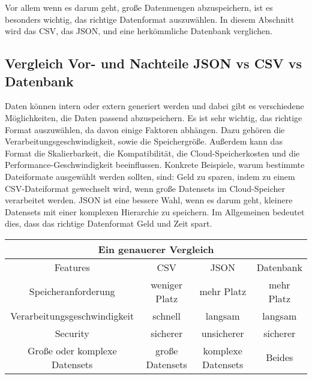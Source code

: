 Vor allem wenn es darum geht, große Datenmengen abzuspeichern, ist es besonders wichtig, das richtige Datenformat auszuwählen. In diesem Abschnitt wird das CSV, das JSON, und eine herkömmliche Datenbank verglichen. 

\subsection{Vergleich Vor- und Nachteile JSON vs CSV vs Datenbank}

Daten können intern oder extern generiert werden und dabei gibt es verschiedene Möglichkeiten, die Daten passend abzuspeichern. Es ist sehr wichtig, das richtige Format auszuwählen, da davon einige Faktoren abhängen. Dazu gehören die Verarbeitungsgeschwindigkeit, sowie die Speichergröße. 
Außerdem kann das Format die Skalierbarkeit, die Kompatibilität, die Cloud-Speicherkosten und die Performance-Geschwindigkeit beeinflussen. 
Konkrete Beispiele, warum bestimmte Dateiformate ausgewählt werden sollten, sind: Geld zu sparen, indem zu einem CSV-Dateiformat gewechselt wird, wenn große Datensets im Cloud-Speicher verarbeitet werden. JSON ist eine bessere Wahl, wenn es darum geht, kleinere Datensets mit einer komplexen Hierarchie zu speichern. 
Im Allgemeinen bedeutet dies, dass das richtige Datenformat Geld und Zeit spart. \cite{csvOrJson}

\begin{center}
    \begin{tabular}{ |c|c|c|c| } 
     \hline
     \multicolumn{4}{|c|}{Ein genauerer Vergleich  } \\
     \hline
     \hline
     Features & CSV & JSON & Datenbank \\ 
     \hline 
     \hline
     Speicheranforderung & weniger Platz & mehr Platz & mehr Platz \\ 
     \hline
     Verarbeitungsgeschwindigkeit & schnell & langsam & langsam \\ 
     \hline
     Security & sicherer & unsicherer & sicherer \\ 
     \hline
     Große oder komplexe Datensets & große Datensets & komplexe Datensets & Beides \\ 
     \hline
    \end{tabular} 
    \end{center}
    \cite{csvOrJson}

